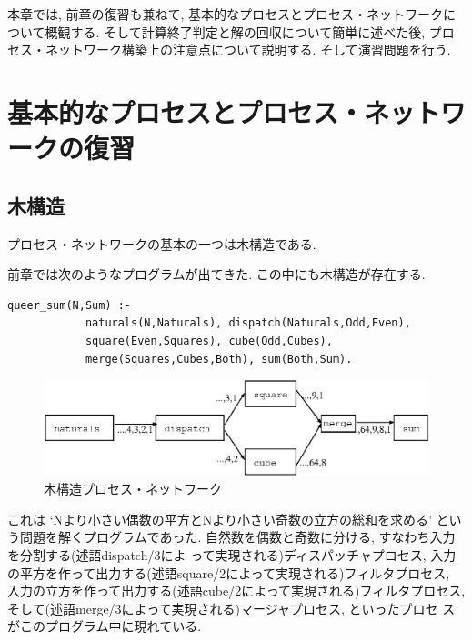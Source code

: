 \documentclass[a4,titlepage]{jsreport}
\newenvironment{program}{\begin{quote}}{\end{quote}}
\begin{document}
本章では, 前章の復習も兼ねて, 
基本的なプロセスとプロセス・ネットワークについて概観する.  
そして計算終了判定と解の回収について簡単に述べた後, 
プロセス・ネットワーク構築上の注意点について説明する.  そして演習問題を行う.  

\section{基本的なプロセスとプロセス・ネットワークの復習}

\subsection{木構造}
プロセス・ネットワークの基本の一つは木構造である.  

前章では次のようなプログラムが出てきた.  この中にも木構造が存在する.  

\begin{Verbatim}[baselinestretch=0.8]
        queer_sum(N,Sum) :-
            naturals(N,Naturals), dispatch(Naturals,Odd,Even),
            square(Even,Squares), cube(Odd,Cubes),
            merge(Squares,Cubes,Both), sum(Both,Sum).
\end{Verbatim}

\begin{figure}
\begin{center}
\includegraphics{fig/sqcu.eps}
\caption{木構造プロセス・ネットワーク}
\label{sqcu}
\end{center}
\end{figure}

これは `Nより小さい偶数の平方とNより小さい奇数の立方の総和を求める'
という問題を解くプログラムであった.  
自然数を偶数と奇数に分ける, すなわち入力を分割する(述語dispatch/3によ
って実現される)ディスパッチャプロセス, 
入力の平方を作って出力する(述語square/2によって実現される)フィルタプロセス, 
入力の立方を作って出力する(述語cube/2によって実現される)フィルタプロセス, 
そして(述語merge/3によって実現される)マージャプロセス, といったプロセ
スがこのプログラム中に現れている.  
\end{document}
